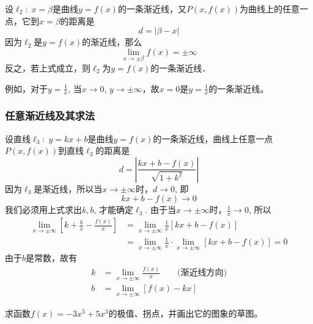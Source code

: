 设$\ell_2:\; x=\beta$是曲线$y=f(x)$的一条渐近线，又$P(x,f(x))$为曲线上的任意一点，它到$x=\beta$的距离是
\[d=|\beta-x|\]
因为$\ell_2$是$y=f(x)$的渐近线，那么
\[\lim_{x\to\pm\beta} f (x) =\pm\infty\]
反之，若上式成立，则$\ell_2$为$y=f(x)$的一条渐近线．

例如，对于$y=\frac{1}{x}$, 当$x\to 0$, $y\to \pm\infty$，故$x=0$是$y=\frac{1}{x}$的一条渐近线。

\subsubsection{任意渐近线及其求法}

设直线$\ell_3:\; y=kx+b$是曲线$y=f(x)$的一条渐近线，曲线上任意一点$P(x,f(x))$到直线$\ell_3$的距离是
\[d=\left|\frac{kx+b-f(x)}{\sqrt{1+k^2}}\right|\]
因为$\ell_3$是渐近线，所以当$x\to\pm\infty$时，$d\to 0$, 即
\[kx+b-f (x) \to 0\]
我们必须用上式求出$k,b$, 才能确定$\ell_3$. 由于当$x\to\pm\infty$时，$\frac{1}{x}\to 0$, 所以
\[\begin{split}
\lim_{x\to\pm\infty}\left[k+\frac{b}{x}-\frac{f(x)}{x}\right]&=\lim_{x\to\pm\infty}\frac{1}{x}[kx+b-f(x)]\\
&=\lim_{x\to\pm\infty}\frac{1}{x}\cdot \lim_{x\to\pm\infty}[kx+b-f(x)]=0
\end{split}\]
由于$b$是常数，故有
\begin{align}
    k&=\lim_{x\to\pm\infty}\frac{f(x)}{x}\qquad \text{(渐近线方向)}\\
b&=\lim_{x\to\pm\infty}[f(x)-kx]
\end{align}

\begin{example}
求函数$f(x)=-3x^5+5x^3$的极值、拐点，并画出它的图象的草图。
\end{example}

